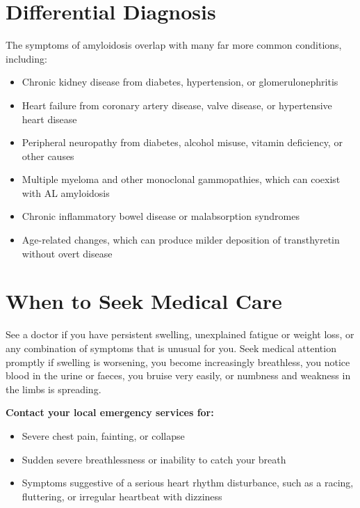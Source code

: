 \section*{Differential Diagnosis}
The symptoms of amyloidosis overlap with many far more common conditions, including:
\begin{itemize}
    \item Chronic kidney disease from diabetes, hypertension, or glomerulonephritis
    \item Heart failure from coronary artery disease, valve disease, or hypertensive heart disease
    \item Peripheral neuropathy from diabetes, alcohol misuse, vitamin deficiency, or other causes
    \item Multiple myeloma and other monoclonal gammopathies, which can coexist with AL amyloidosis
    \item Chronic inflammatory bowel disease or malabsorption syndromes
    \item Age-related changes, which can produce milder deposition of transthyretin without overt disease
\end{itemize}

\section*{When to Seek Medical Care}
See a doctor if you have persistent swelling, unexplained fatigue or weight loss, or any combination of symptoms that is unusual for you. Seek medical attention promptly if swelling is worsening, you become increasingly breathless, you notice blood in the urine or faeces, you bruise very easily, or numbness and weakness in the limbs is spreading.

\textbf{Contact your local emergency services for:}
\begin{itemize}
    \item Severe chest pain, fainting, or collapse
    \item Sudden severe breathlessness or inability to catch your breath
    \item Symptoms suggestive of a serious heart rhythm disturbance, such as a racing, fluttering, or irregular heartbeat with dizziness
\end{itemize}

